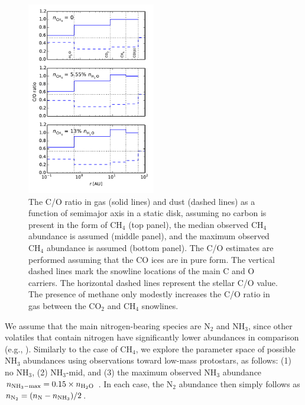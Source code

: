 \documentclass[apj]{emulateapj}
\begin{document}
\begin{figure}[h!]
\centering
\includegraphics[width=0.5\textwidth]{C_O_ratio_CH4.pdf}
\caption{The C/O ratio in gas (solid lines) and dust (dashed lines) as a function of semimajor axis in a static disk, assuming no carbon is present in the form of CH$_4$ (top panel), the median observed CH$_4$ abundance is assumed (middle panel), and the maximum observed CH$_4$ abundance is assumed (bottom panel). The C/O estimates are performed assuming that the CO ices are in pure form. The vertical dashed lines mark the snowline locations of the main C and O carriers. The horizontal dashed lines represent the stellar C/O value. The presence of methane only modestly increases the C/O ratio in gas between the CO$_2$ and CH$_4$ snowlines.} 
\label{fig:COstatic}
\end{figure}

We assume that the main nitrogen-bearing species are N$_2$ and NH$_3$, since other volatiles that contain nitrogen have significantly lower abundances in comparison (e.g., \citealt{mumma11}). Similarly to the case of CH$_4$, we explore the parameter space of possible NH$_3$ abundances using observations toward low-mass protostars, as follows: (1) no NH$_3$, (2) NH$_3$-mid, and (3) the maximum observed NH$_3$ abundance $n_{\rm NH_3-max}=0.15 \times n_{\rm H_2O}$ \citep{bottinelli10}. In each case, the N$_2$ abundance then simply follows as $n_{\rm N_2}=(n_{\rm N}-n_{\rm NH_3})/2$. 
\end{document}
